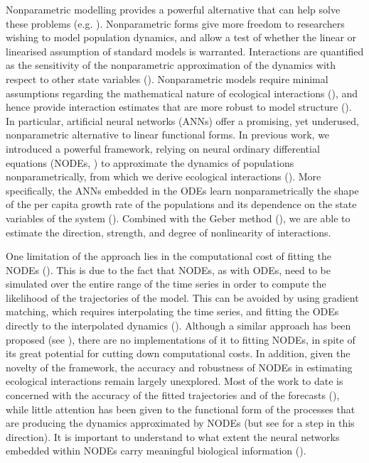 \documentclass[11pt, oneside]{article}
\begin{document}
Nonparametric modelling provides a powerful alternative that can help solve these problems (e.g. \cite{Jost2000,Wood2001,Ellner2002,Wu2005,Pasquali2018}).
Nonparametric forms give more freedom to researchers wishing to  model population dynamics, and allow a test of whether the linear or linearised assumption of standard models is warranted.
Interactions are quantified as the sensitivity of the nonparametric approximation of the dynamics with respect to other state variables (\cite{Sugihara2012,Ushio2018}).
Nonparametric models require minimal assumptions regarding the mathematical nature of ecological interactions (\cite{Jost2000,Gross2005}), and hence provide interaction estimates that are more robust to model structure (\cite{Wood2001}).
In particular, artificial neural networks (ANNs) offer a promising, yet underused, nonparametric alternative to linear functional forms.
In previous work, we introduced a powerful framework, relying on neural ordinary differential equations (NODEs, \cite{Chen2018}) to approximate the dynamics of populations nonparametrically, from which we derive ecological interactions (\cite{Bonnaffe2021a}).
More specifically, the ANNs embedded in the ODEs learn nonparametrically the shape of the per capita growth rate of the populations and its dependence on the state variables of the system (\cite{Bonnaffe2021a}).
Combined with the Geber method (\cite{Hairston2005}), we are able to estimate the direction, strength, and degree of nonlinearity of interactions.

One limitation of the approach lies in the computational cost of fitting the NODEs (\cite{Chen2018,Bonnaffe2021a}).
This is due to the fact that NODEs, as with ODEs, need to be simulated over the entire range of the time series in order to compute the likelihood of the trajectories of the model.
This can be avoided by using gradient matching, which requires interpolating the time series, and fitting the ODEs directly to the interpolated dynamics (\cite{Jost2000,Aarts2001,Ellner2002}).
Although a similar approach has been proposed (see \cite{Treven2021}), there are no implementations of it to fitting NODEs, in spite of its great potential for cutting down computational costs.
In addition, given the novelty of the framework, the accuracy and robustness of NODEs in estimating ecological interactions remain largely unexplored.
Most of the work to date is concerned with the accuracy of the fitted trajectories and of the forecasts (\cite{Mai2016,Treven2021,Frank2022}), while little attention has been given to the functional form of the processes that are producing the dynamics approximated by NODEs (but see \cite{Hu2020} for a step in this direction).
It is important to understand to what extent the neural networks embedded within NODEs carry meaningful biological information (\cite{Novak2021}).
\end{document}
